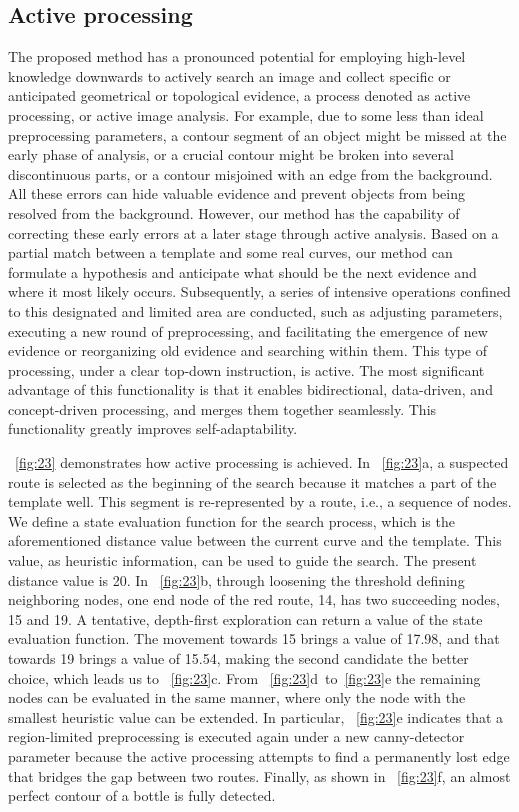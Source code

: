 \documentclass[journal]{IEEEtran}
\begin{document}
\subsection{Active processing}

The proposed method has a pronounced potential for employing high-level knowledge downwards to actively search an image and collect specific or anticipated geometrical or topological evidence, 
a process denoted as active processing, or active image analysis. 
For example, due to some less than ideal preprocessing parameters, 
a contour segment of an object might be missed at the early phase of analysis, 
or a crucial contour might be broken into several discontinuous parts, 
or a contour misjoined with an edge from the background. 
All these errors can hide valuable evidence and prevent objects from being resolved from the background. 
However, our method has the capability of correcting these early errors at a later stage through active analysis. 
Based on a partial match between a template and some real curves, 
our method can formulate a hypothesis and anticipate what should be the next evidence and where it most likely occurs. 
Subsequently, a series of intensive operations confined to this designated and limited area are conducted, 
such as adjusting parameters, executing a new round of preprocessing, 
and facilitating the emergence of new evidence or reorganizing old evidence and searching within them. 
This type of processing, under a clear top-down instruction, is active. 
The most significant advantage of this functionality is that it enables bidirectional, data-driven, 
and concept-driven processing, and merges them together seamlessly. 
This functionality greatly improves self-adaptability.
  
\figurename~\ref{fig:23} demonstrates how active processing is achieved. 
In \figurename~\ref{fig:23}a, a suspected route is selected as the beginning of the search because it matches a part of the template well. 
This segment is re-represented by a route, i.e., a sequence of nodes. 
We define a state evaluation function for the search process, 
which is the aforementioned distance value between the current curve and the template. 
This value, as heuristic information, can be used to guide the search. 
The present distance value is 20. 
In \figurename~\ref{fig:23}b, through loosening the threshold defining neighboring nodes, 
one end node of the red route, 14, has two succeeding nodes, 15 and 19. 
A tentative, depth-first exploration can return a value of the state evaluation function. 
The movement towards 15 brings a value of 17.98, and that towards 19 brings a value of 15.54, 
making the second candidate the better choice, which leads us to \figurename~\ref{fig:23}c. 
From \figurename~\ref{fig:23}d~to~\ref{fig:23}e the remaining nodes can be evaluated in the same manner, 
where only the node with the smallest heuristic value can be extended. 
In particular, \figurename~\ref{fig:23}e indicates that a region-limited preprocessing is executed again under a new canny-detector parameter because the active processing attempts to find a permanently lost edge that bridges the gap between two routes. 
Finally, as shown in \figurename~\ref{fig:23}f, an almost perfect contour of a bottle is fully detected.
\end{document}
